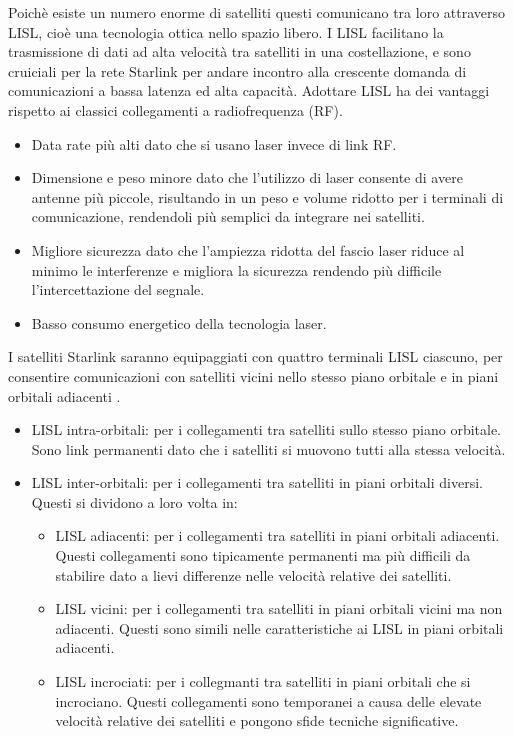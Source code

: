 Poichè esiste un numero enorme di satelliti questi comunicano tra loro attraverso \ac{LISL}, cioè una tecnologia ottica nello spazio libero.
I \ac{LISL} facilitano la trasmissione di dati ad alta velocità tra satelliti in una costellazione, e sono cruiciali per la rete Starlink per andare incontro alla crescente domanda di comunicazioni a bassa latenza ed alta capacità.
Adottare \ac{LISL} ha dei vantaggi rispetto ai classici collegamenti a radiofrequenza (\ac{RF}).
\begin{itemize}
  \item Data rate più alti dato che si usano laser invece di link \ac{RF}.
  \item Dimensione e peso minore dato che l'utilizzo di laser consente di avere antenne più piccole, risultando in un peso e volume ridotto per i terminali di comunicazione, rendendoli più semplici da integrare nei satelliti.
  \item Migliore sicurezza dato che l'ampiezza ridotta del fascio laser riduce al minimo le interferenze e migliora la sicurezza rendendo più difficile l'intercettazione del segnale.
  \item Basso consumo energetico della tecnologia laser.
\end{itemize}

I satelliti Starlink saranno equipaggiati con quattro terminali \ac{LISL} ciascuno, per consentire comunicazioni con satelliti vicini nello stesso piano orbitale e in piani orbitali adiacenti \cite{chaudhry_laser_2021}.
\begin{itemize}
  \item \ac{LISL} intra-orbitali: per i collegamenti tra satelliti sullo stesso piano orbitale. Sono link permanenti dato che i satelliti si muovono tutti alla stessa velocità.
  \item \ac{LISL} inter-orbitali: per i collegamenti tra satelliti in piani orbitali diversi.
  Questi si dividono a loro volta in:
  \begin{itemize}
    \item \ac{LISL} adiacenti: per i collegamenti tra satelliti in piani orbitali adiacenti. Questi collegamenti sono tipicamente permanenti ma più difficili da stabilire dato a lievi differenze nelle velocità relative dei satelliti.
    \item \ac{LISL} vicini: per i collegamenti tra satelliti in piani orbitali vicini ma non adiacenti. Questi sono simili nelle caratteristiche ai \ac{LISL} in piani orbitali adiacenti.
    \item \ac{LISL} incrociati: per i collegmanti tra  satelliti in piani orbitali che si incrociano. Questi collegamenti sono temporanei a causa delle elevate velocità relative dei satelliti e pongono sfide tecniche significative.
  \end{itemize}
\end{itemize}

